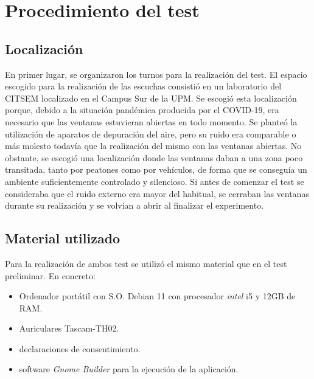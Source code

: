 \documentclass[11pt,a4paper,twoside]{book}
\begin{document}
        \section{Procedimiento del test}
        
            \subsection*{Localización}
                En primer lugar, se organizaron los turnos para la realización del test. El espacio escogido para la realización de las escuchas consistió en un laboratorio del CITSEM localizado en el Campus Sur de la UPM. Se escogió esta localización porque, debido a la situación pandémica producida por el COVID-19, era necesario que las ventanas estuvieran abiertas en todo momento. Se planteó la utilización de aparatos de depuración del aire, pero su ruido era comparable o más molesto todavía que la realización del mismo con las ventanas abiertas. No obstante, se escogió una localización donde las ventanas daban a una zona poco transitada, tanto por peatones como por vehículos, de forma que se conseguía un ambiente suficientemente controlado y silencioso. Si antes de comenzar el test se consideraba que el ruido externo era mayor del habitual, se cerraban las ventanas durante su realización y se volvían a abrir al finalizar el experimento.
            
            \subsection*{Material utilizado}
                Para la realización de ambos test se utilizó el mismo material que en el test preliminar. En concreto:
                \begin{itemize}
                    \item Ordenador portátil con S.O. Debian 11 con procesador \textit{intel} i5 y 12GB de RAM.
                    \item Auriculares Tascam-TH02.
                    \item declaraciones de consentimiento.
                    \item software \textit{Gnome Builder} para la ejecución de la aplicación.
                \end{itemize}
                
\end{document}
